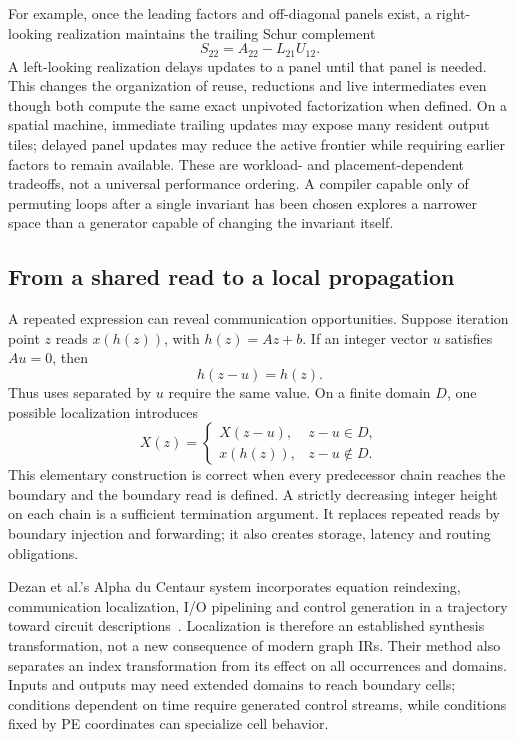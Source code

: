 \documentclass[final,3p,times,authoryear]{elsarticle}
\begin{document}
For example, once the leading factors and off-diagonal panels exist, a right-looking realization maintains the trailing Schur complement
\begin{equation}
 S_{22}=A_{22}-L_{21}U_{12}.
\end{equation}
A left-looking realization delays updates to a panel until that panel is needed. This changes the organization of reuse, reductions and live intermediates even though both compute the same exact unpivoted factorization when defined. On a spatial machine, immediate trailing updates may expose many resident output tiles; delayed panel updates may reduce the active frontier while requiring earlier factors to remain available. These are workload- and placement-dependent tradeoffs, not a universal performance ordering. A compiler capable only of permuting loops after a single invariant has been chosen explores a narrower space than a generator capable of changing the invariant itself.

\subsection{From a shared read to a local propagation}
A repeated expression can reveal communication opportunities. Suppose iteration point $z$ reads $x(h(z))$, with $h(z)=Az+b$. If an integer vector $u$ satisfies $Au=0$, then
\begin{equation}\label{eq:reuse-kernel}
 h(z-u)=h(z).
\end{equation}
Thus uses separated by $u$ require the same value. On a finite domain $D$, one possible localization introduces
\begin{equation}\label{eq:localize}
 X(z)=
 \begin{cases}
 X(z-u),&z-u\in D,\\
 x(h(z)),&z-u\notin D.
 \end{cases}
\end{equation}
This elementary construction is correct when every predecessor chain reaches the boundary and the boundary read is defined. A strictly decreasing integer height on each chain is a sufficient termination argument. It replaces repeated reads by boundary injection and forwarding; it also creates storage, latency and routing obligations.

Dezan et al.'s Alpha du Centaur system incorporates equation reindexing, communication localization, I/O pipelining and control generation in a trajectory toward circuit descriptions~\citep{dezan1991}. Localization is therefore an established synthesis transformation, not a new consequence of modern graph IRs. Their method also separates an index transformation from its effect on all occurrences and domains. Inputs and outputs may need extended domains to reach boundary cells; conditions dependent on time require generated control streams, while conditions fixed by PE coordinates can specialize cell behavior.
\end{document}
